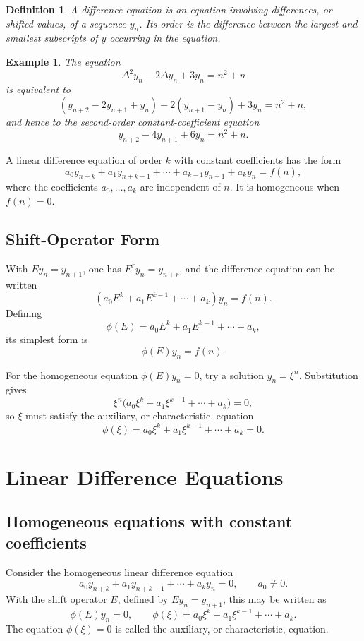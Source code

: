 \documentclass[11pt,a4paper]{article}
\numberwithin{equation}{section}
\theoremstyle{spacedplain}
\theoremstyle{spaceddefinition}
\newtheorem{definition}[theorem]{Definition}
\newtheorem{example}[theorem]{Example}
\theoremstyle{spacedremark}
\begin{document}
\begin{definition}
A difference equation is an equation involving differences, or shifted
values, of a sequence \(y_n\).  Its order is the difference between the
largest and smallest subscripts of \(y\) occurring in the equation.
\end{definition}

\begin{example}
The equation
\[
  \Delta^2y_n-2\Delta y_n+3y_n=n^2+n
\]
is equivalent to
\[
  (y_{n+2}-2y_{n+1}+y_n)
  -2(y_{n+1}-y_n)+3y_n=n^2+n,
\]
and hence to the second-order constant-coefficient equation
\[
  y_{n+2}-4y_{n+1}+6y_n=n^2+n.
\]
\end{example}

A linear difference equation of order \(k\) with constant coefficients
has the form
\[
  a_0y_{n+k}+a_1y_{n+k-1}+\cdots+a_{k-1}y_{n+1}+a_ky_n=f(n),
\]
where the coefficients \(a_0,\ldots,a_k\) are independent of \(n\).
It is homogeneous when \(f(n)=0\).

\subsection{Shift-Operator Form}

With \(Ey_n=y_{n+1}\), one has \(E^ry_n=y_{n+r}\), and the difference
equation can be written
\[
  (a_0E^k+a_1E^{k-1}+\cdots+a_k)y_n=f(n).
\]
Defining
\[
  \phi(E)=a_0E^k+a_1E^{k-1}+\cdots+a_k,
\]
its simplest form is
\[
  \phi(E)y_n=f(n).
\]

For the homogeneous equation \(\phi(E)y_n=0\), try a solution
\(y_n=\xi^n\).  Substitution gives
\[
  \xi^n\bigl(a_0\xi^k+a_1\xi^{k-1}+\cdots+a_k\bigr)=0,
\]
so \(\xi\) must satisfy the auxiliary, or characteristic, equation
\[
  \phi(\xi)
  =a_0\xi^k+a_1\xi^{k-1}+\cdots+a_k=0.
\]

\section{Linear Difference Equations}

\subsection{Homogeneous equations with constant coefficients}

Consider the homogeneous linear difference equation
\[
  a_0y_{n+k}+a_1y_{n+k-1}+\cdots+a_ky_n=0,
  \qquad a_0\ne 0.
\]
With the shift operator \(E\), defined by \(Ey_n=y_{n+1}\), this may be
written as
\[
  \phi(E)y_n=0,
  \qquad
  \phi(\xi)=a_0\xi^k+a_1\xi^{k-1}+\cdots+a_k.
\]
The equation \(\phi(\xi)=0\) is called the auxiliary, or characteristic,
equation.
\end{document}
